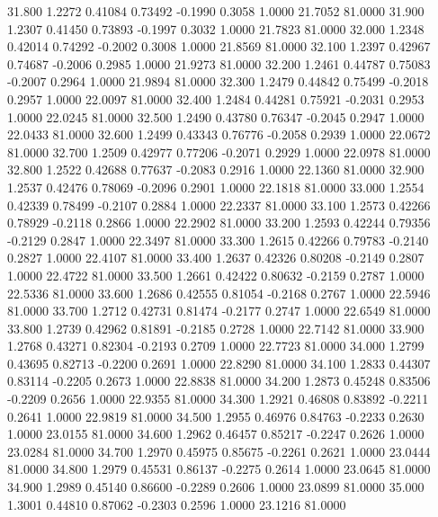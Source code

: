   31.800   1.2272   0.41084   0.73492  -0.1990   0.3058   1.0000  21.7052  81.0000
  31.900   1.2307   0.41450   0.73893  -0.1997   0.3032   1.0000  21.7823  81.0000
  32.000   1.2348   0.42014   0.74292  -0.2002   0.3008   1.0000  21.8569  81.0000
  32.100   1.2397   0.42967   0.74687  -0.2006   0.2985   1.0000  21.9273  81.0000
  32.200   1.2461   0.44787   0.75083  -0.2007   0.2964   1.0000  21.9894  81.0000
  32.300   1.2479   0.44842   0.75499  -0.2018   0.2957   1.0000  22.0097  81.0000
  32.400   1.2484   0.44281   0.75921  -0.2031   0.2953   1.0000  22.0245  81.0000
  32.500   1.2490   0.43780   0.76347  -0.2045   0.2947   1.0000  22.0433  81.0000
  32.600   1.2499   0.43343   0.76776  -0.2058   0.2939   1.0000  22.0672  81.0000
  32.700   1.2509   0.42977   0.77206  -0.2071   0.2929   1.0000  22.0978  81.0000
  32.800   1.2522   0.42688   0.77637  -0.2083   0.2916   1.0000  22.1360  81.0000
  32.900   1.2537   0.42476   0.78069  -0.2096   0.2901   1.0000  22.1818  81.0000
  33.000   1.2554   0.42339   0.78499  -0.2107   0.2884   1.0000  22.2337  81.0000
  33.100   1.2573   0.42266   0.78929  -0.2118   0.2866   1.0000  22.2902  81.0000
  33.200   1.2593   0.42244   0.79356  -0.2129   0.2847   1.0000  22.3497  81.0000
  33.300   1.2615   0.42266   0.79783  -0.2140   0.2827   1.0000  22.4107  81.0000
  33.400   1.2637   0.42326   0.80208  -0.2149   0.2807   1.0000  22.4722  81.0000
  33.500   1.2661   0.42422   0.80632  -0.2159   0.2787   1.0000  22.5336  81.0000
  33.600   1.2686   0.42555   0.81054  -0.2168   0.2767   1.0000  22.5946  81.0000
  33.700   1.2712   0.42731   0.81474  -0.2177   0.2747   1.0000  22.6549  81.0000
  33.800   1.2739   0.42962   0.81891  -0.2185   0.2728   1.0000  22.7142  81.0000
  33.900   1.2768   0.43271   0.82304  -0.2193   0.2709   1.0000  22.7723  81.0000
  34.000   1.2799   0.43695   0.82713  -0.2200   0.2691   1.0000  22.8290  81.0000
  34.100   1.2833   0.44307   0.83114  -0.2205   0.2673   1.0000  22.8838  81.0000
  34.200   1.2873   0.45248   0.83506  -0.2209   0.2656   1.0000  22.9355  81.0000
  34.300   1.2921   0.46808   0.83892  -0.2211   0.2641   1.0000  22.9819  81.0000
  34.500   1.2955   0.46976   0.84763  -0.2233   0.2630   1.0000  23.0155  81.0000
  34.600   1.2962   0.46457   0.85217  -0.2247   0.2626   1.0000  23.0284  81.0000
  34.700   1.2970   0.45975   0.85675  -0.2261   0.2621   1.0000  23.0444  81.0000
  34.800   1.2979   0.45531   0.86137  -0.2275   0.2614   1.0000  23.0645  81.0000
  34.900   1.2989   0.45140   0.86600  -0.2289   0.2606   1.0000  23.0899  81.0000
  35.000   1.3001   0.44810   0.87062  -0.2303   0.2596   1.0000  23.1216  81.0000
